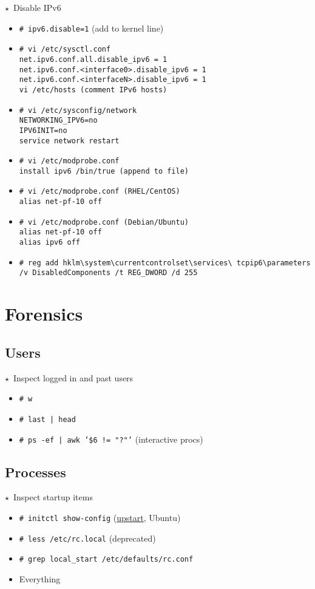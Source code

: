 \documentclass[10pt,landscape]{article}
\newcommand{\os}[1]{\texttt{\footnotesize{#1}}}
\newcommand{\freebsd}{\os{F}}
\newcommand{\unix}{\os{U}}
\newcommand{\linux}{\os{L}}
\newcommand{\windows}{\os{W}}
\newenvironment{action}[1]
  {\begin{minipage}[c]{\linewidth}$\star$~#1\begin{itemize}[leftmargin=1cm]}
  {\end{itemize}\end{minipage}\vspace*{3pt}}
\newcommand{\cmd}[2]{\item[#1] {\small\tt\# #2}}
\newcommand{\comment}[1]{\textrm{\small(#1)}}
\newcommand{\tool}[2]{\item[#1] {\footnotesize\sc{#2}}\xspace}
\newcommand{\button}[1]{\footnotesize\sf#1}
\begin{document}
\begin{multicols*}{3}
\begin{action}{Disable IPv6}
  \cmd{\linux}{ipv6.disable=1} \comment{add to kernel line}
  \cmd{\linux}{vi /etc/sysctl.conf\\
    net.ipv6.conf.all.disable\_ipv6 = 1\\
    net.ipv6.conf.<interface0>.disable\_ipv6 = 1\\
    net.ipv6.conf.<interfaceN>.disable\_ipv6 = 1\\
    vi /etc/hosts \comment{comment IPv6 hosts}}
  \cmd{\linux}{vi /etc/sysconfig/network\\
    NETWORKING\_IPV6=no\\
    IPV6INIT=no\\
    service network restart}
  \cmd{\linux}{vi /etc/modprobe.conf\\
    install ipv6 /bin/true \comment{append to file}}
  \cmd{\linux}{vi /etc/modprobe.conf  \comment{RHEL/CentOS}\\
    alias net-pf-10 off}
  \cmd{\linux}{vi /etc/modprobe.conf \comment{Debian/Ubuntu}\\
    alias net-pf-10 off \\
    alias ipv6 off}
    \cmd{\windows}{reg add
    hklm{\textbackslash}system{\textbackslash}currentcontrolset{\textbackslash}services{\textbackslash}
    tcpip6{\textbackslash}parameters /v DisabledComponents /t REG\_DWORD /d 255}
\end{action}

\section*{Forensics}

\subsection*{Users}

\begin{action}{Inspect logged in and past users}
  \cmd{\unix}{w}
  \cmd{\unix}{last | head}
  \cmd{\unix}{ps -ef | awk '\$6 != "?"'} (interactive procs)
\end{action}

\subsection*{Processes}

\begin{action}{Inspect startup items}
  \cmd{\linux}{initctl show-config}
    (\href{http://upstart.ubuntu.com/cookbook/upstart_cookbook.pdf}{upstart},
    Ubuntu)
  \cmd{\freebsd}{less /etc/rc.local} (deprecated)
  \cmd{\freebsd}{grep local\_start /etc/defaults/rc.conf}
  \tool{\windows}{Autoruns} \button{Everything}
\end{action}


\end{multicols*}
\end{document}
